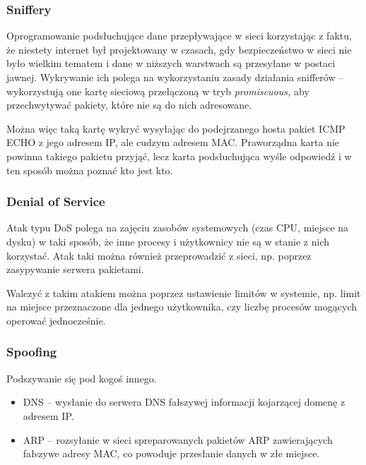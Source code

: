 \subsubsection{Sniffery}
Oprogramowanie podsłuchujące dane przepływające w sieci korzystając z faktu, że niestety internet był projektowany w czasach, gdy bezpieczeństwo w sieci nie było wielkim tematem i dane w niższych warstwach są przesyłane w postaci jawnej.
Wykrywanie ich polega na wykorzystaniu zasady działania snifferów -- wykorzystują one kartę sieciową przełączoną w tryb \textit{promiscuous,} aby przechwytywać pakiety, które nie są do nich adresowane.

Można więc taką kartę wykryć wysyłając do podejrzanego hosta pakiet ICMP ECHO z jego adresem IP, ale cudzym adresem MAC.
Praworządna karta nie powinna takiego pakietu przyjąć, lecz karta podsłuchująca wyśle odpowiedź i w ten sposób można poznać kto jest kto.

\subsubsection{Denial of Service}
Atak typu DoS polega na zajęciu zasobów systemowych (czas CPU, miejsce na dysku) w taki sposób, że inne procesy i użytkownicy nie są w stanie z nich korzystać.
Atak taki można również przeprowadzić z sieci, np. poprzez zasypywanie serwera pakietami.

Walczyć z takim atakiem można poprzez ustawienie limitów w systemie, np. limit na miejsce przeznaczone dla jednego użytkownika, czy liczbę procesów mogących operować jednocześnie.

\subsubsection{Spoofing}
Podszywanie się pod kogoś innego.
\begin{itemize}
	\item{DNS -- wysłanie do serwera DNS fałszywej informacji kojarzącej domenę z adresem IP.}
	\item{ARP -- rozsyłanie w sieci spreparowanych pakietów ARP zawierających fałszywe adresy MAC, co powoduje przesłanie danych w złe miejsce.}
\end{itemize}